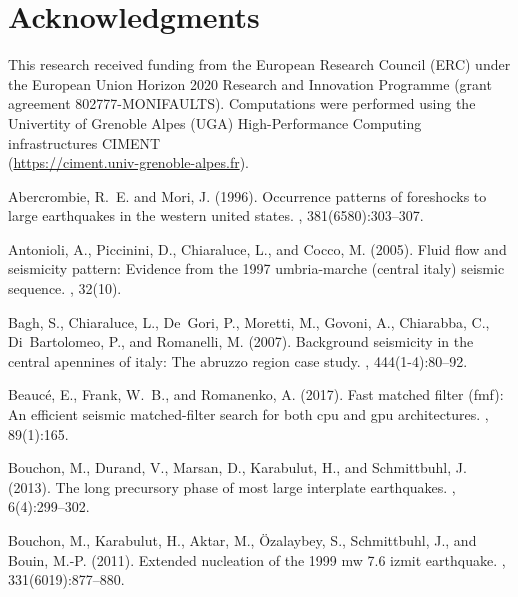 \documentclass[a4paper,12pt,twoside]{article}
\begin{document}
\section*{Acknowledgments}

This research received funding from the European Research Council (ERC) under the European Union   Horizon 2020 Research and Innovation Programme (grant  agreement 802777-MONIFAULTS). Computations were performed using the Univertity of Grenoble Alpes (UGA) High-Performance Computing infrastructures CIMENT \\ \noindent (\href{https://ciment.univ-grenoble-alpes.fr}{\color{blue}https://ciment.univ-grenoble-alpes.fr}). 


\begin{thebibliography}{}

Abercrombie, R.~E. and Mori, J. (1996).
\newblock Occurrence patterns of foreshocks to large earthquakes in the western
  united states.
, 381(6580):303--307.

Antonioli, A., Piccinini, D., Chiaraluce, L., and Cocco, M. (2005).
\newblock Fluid flow and seismicity pattern: Evidence from the 1997
  umbria-marche (central italy) seismic sequence.
, 32(10).

Bagh, S., Chiaraluce, L., De~Gori, P., Moretti, M., Govoni, A., Chiarabba, C.,
  Di~Bartolomeo, P., and Romanelli, M. (2007).
\newblock Background seismicity in the central apennines of italy: The abruzzo
  region case study.
, 444(1-4):80--92.

Beauc\'e, E., Frank, W.~B., and Romanenko, A. (2017).
\newblock Fast matched filter (fmf): An efficient seismic matched-filter search
  for both cpu and gpu architectures.
, 89(1):165.

Bouchon, M., Durand, V., Marsan, D., Karabulut, H., and Schmittbuhl, J. (2013).
\newblock The long precursory phase of most large interplate earthquakes.
, 6(4):299--302.

Bouchon, M., Karabulut, H., Aktar, M., {\"O}zalaybey, S., Schmittbuhl, J., and
  Bouin, M.-P. (2011).
\newblock Extended nucleation of the 1999 mw 7.6 izmit earthquake.
, 331(6019):877--880.


\end{thebibliography}
\end{document}
